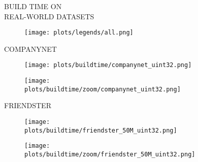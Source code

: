 \documentclass{article}
\begin{document}
\begin{figure}[!htbp]
\fbox
{
\begin{minipage}[t][0.98\textheight][t]{\textwidth}
\centering
    \begin{minipage}{0.2\linewidth}
    \footnotesize{BUILD TIME ON \\ REAL-WORLD DATASETS}
    \end{minipage}
   \begin{minipage}{0.75\linewidth}
        \begin{figure}[H]
        \texttt{[image: plots/legends/all.png]}
        \end{figure}
    \end{minipage}
    \vspace*{-10px}
    
    \begin{minipage}{0.03\linewidth}
    \begin{sideways}\small COMPANYNET\end{sideways}
    \end{minipage}
    \begin{minipage}{0.39\linewidth}
        \begin{figure}[H]
        \texttt{[image: plots/buildtime/companynet\_uint32.png]}
        \end{figure}
    \end{minipage}
    \begin{minipage}{0.39\linewidth}
        \begin{figure}[H]
            \texttt{[image: plots/buildtime/zoom/companynet\_uint32.png]}
        \end{figure}
    \end{minipage}
\vspace*{-0.55cm}

\begin{minipage}{0.03\linewidth}
    \begin{sideways}\small FRIENDSTER\end{sideways}
    \end{minipage}
    \begin{minipage}{0.39\linewidth}
        \begin{figure}[H]
        \texttt{[image: plots/buildtime/friendster\_50M\_uint32.png]}
        \end{figure}
    \end{minipage}
    \begin{minipage}{0.39\linewidth}
        \begin{figure}[H]
            \texttt{[image: plots/buildtime/zoom/friendster\_50M\_uint32.png]}
        \end{figure}
    \end{minipage}
\vspace*{-0.55cm}


\end{minipage}}
\end{figure}
\end{document}
